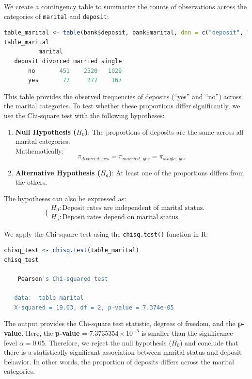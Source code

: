\documentclass[
]{book}
\newcommand{\passthrough}[1]{#1}
\providecommand{\tightlist}{%
  \setlength{\itemsep}{0pt}\setlength{\parskip}{0pt}}
\theoremstyle{definition}
\theoremstyle{definition}
\theoremstyle{definition}
\theoremstyle{definition}
\theoremstyle{remark}
\begin{document}
We create a contingency table to summarize the counts of observations across the categories of \passthrough{\lstinline!marital!} and \passthrough{\lstinline!deposit!}:

\begin{lstlisting}[language=R]
table_marital <- table(bank$deposit, bank$marital, dnn = c("deposit", "marital"))
table_marital
          marital
   deposit divorced married single
       no       451    2520   1029
       yes       77     277    167
\end{lstlisting}

This table provides the observed frequencies of deposits (``yes'' and ``no'') across the marital categories. To test whether these proportions differ significantly, we use the Chi-square test with the following hypotheses:

\begin{enumerate}
\def\labelenumi{\arabic{enumi}.}
\tightlist
\item
  \textbf{Null Hypothesis (\(H_0\))}: The proportions of deposits are the same across all marital categories.\\
  Mathematically:\\
  \[
  \pi_{divorced, \ yes} = \pi_{married, \ yes} = \pi_{single, \ yes}
  \]
\item
  \textbf{Alternative Hypothesis (\(H_a\))}: At least one of the proportions differs from the others.
\end{enumerate}

The hypotheses can also be expressed as:
\[
\bigg\{
\begin{matrix}
    H_0: \text{Deposit rates are independent of marital status.} \\
    H_a: \text{Deposit rates depend on marital status.}
\end{matrix}
\]

We apply the Chi-square test using the \passthrough{\lstinline!chisq.test()!} function in R:

\begin{lstlisting}[language=R]
chisq_test <- chisq.test(table_marital)
chisq_test
   
    Pearson's Chi-squared test
   
   data:  table_marital
   X-squared = 19.03, df = 2, p-value = 7.374e-05
\end{lstlisting}

The output provides the Chi-square test statistic, degrees of freedom, and the \textbf{p-value}. Here, the \textbf{p-value} = \ensuremath{7.3735354\times 10^{-5}} is smaller than the significance level \(\alpha = 0.05\). Therefore, we reject the null hypothesis (\(H_0\)) and conclude that there is a statistically significant association between marital status and deposit behavior. In other words, the proportion of deposits differs across the marital categories.
\end{document}
